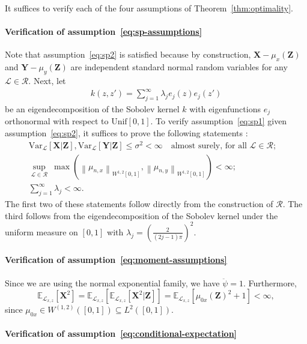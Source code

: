 \documentclass[aos]{imsart}
\theoremstyle{plain}
\theoremstyle{remark}
\newcommand{\E}{\mathbb E}								%
\newcommand{\V}{\mathrm{Var}}							%
\newcommand{\norm}[1]{\left\lVert{#1}\right\rVert}		%
\newcommand{\prx}{\bm X}								%
\newcommand{\prz}{\bm Z}								%
\newcommand{\pry}{{\bm Y}}								%
\newcommand{\law}{\mathcal L}							%
\newcommand{\regclass}{\mathscr R}					    %
\begin{document}
It suffices to verify each of the four assumptions of Theorem~\ref{thm:optimality}.

\paragraph*{Verification of assumption~\eqref{eq:sp-assumptions}}

Note that assumption~\eqref{eq:sp2} is satisfied because by construction, $\prx - \mu_{x}(\prz)$ and $\pry - \mu_y(\prz)$ are independent standard normal random variables for any $\law \in \regclass$. Next, let 
\begin{align}\label{eq:eigen_decomp}
	k(z,z')=\sum_{j=1}^{\infty}\lambda_{j}e_{j}(z)e_{j}(z')
\end{align}
be an eigendecomposition of the Sobolev kernel $k$ with eigenfunctions $e_{j}$ orthonormal with respect to $\text{Unif}[0,1]$. To verify assumption~\eqref{eq:sp1} given assumption~\eqref{eq:sp2}, it suffices to prove the following statements \citep[Theorem 11 and Remark 12]{Shah2018}: 
\begin{align*}
\V_{\law}[\prx|\prz], \V_{\law}[\pry|\prz] \leq \sigma^2 < \infty \quad \text{almost surely, for all } \law \in \regclass;& \\
\sup_{\law \in \regclass}\ \max(\norm{\mu_{n,x}}_{W^{1,2}[0,1]}, \norm{\mu_{n,y}}_{W^{1,2}[0,1]}) < \infty;& \\
\sum_{j = 1}^\infty \lambda_{j} < \infty.&
\end{align*}
The first two of these statements follow directly from the construction of $\regclass$. The third follows from the eigendecomposition of the Sobolev kernel under the uniform measure on $[0,1]$ \citep[Example 12.23]{Wainwright2019} with $\lambda_j = (\frac{2}{(2j-1)\pi})^2$.

\paragraph*{Verification of assumption~\eqref{eq:moment-assumptions}}

Since we are using the normal exponential family, we have $\ddot \psi = 1$. Furthermore, 
\begin{equation}
\E_{\law_{x,z}}[\prx^2] = \E_{\law_{x,z}}[\E_{\law_{x,z}}[\prx^2|\prz]] = \E_{\law_{x,z}}[\mu_{0x}(\prz)^2 + 1] < \infty,
\end{equation}
since $\mu_{0x} \in W^{(1,2)}([0,1]) \subseteq L^2([0,1])$.

\paragraph*{Verification of assumption~\eqref{eq:conditional-expectation}}
\end{document}
